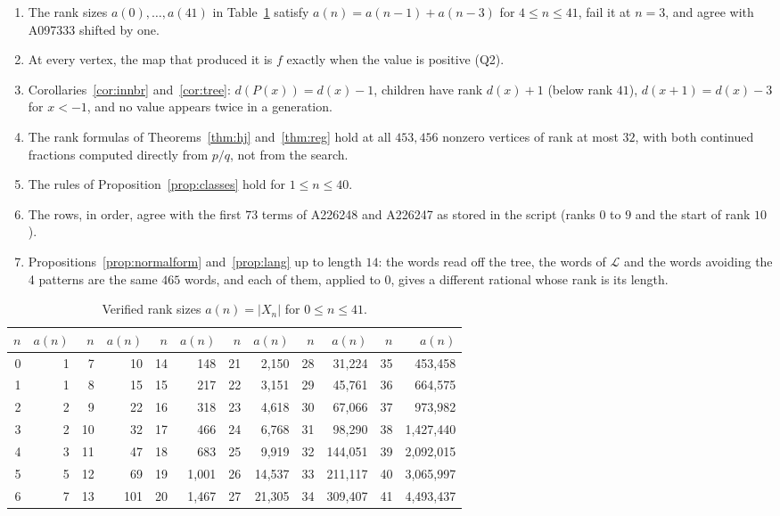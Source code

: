 \documentclass[11pt]{article}
\theoremstyle{definition}
\theoremstyle{remark}
\newcommand{\lang}{\mathcal{L}}
\begin{document}
\begin{enumerate}[itemsep=0pt,topsep=3pt]
\item The rank sizes $a(0),\dots,a(41)$ in Table~\ref{tab:counts} satisfy $a(n)=a(n-1)+a(n-3)$ for
$4\le n\le41$, fail it at $n=3$, and agree with A097333 shifted by one.
\item At every vertex, the map that produced it is $f$ exactly when the value is positive (Q2).
\item Corollaries~\ref{cor:innbr} and~\ref{cor:tree}: $d(P(x))=d(x)-1$, children have rank $d(x)+1$
(below rank $41$), $d(x+1)=d(x)-3$ for $x<-1$, and no value appears twice in a generation.
\item The rank formulas of Theorems~\ref{thm:hj} and~\ref{thm:reg} hold at all $453{,}456$ nonzero
vertices of rank at most $32$, with both continued fractions computed directly from $p/q$, not
from the search.
\item The rules of Proposition~\ref{prop:classes} hold for $1\le n\le40$.
\item The rows, in order, agree with the first $73$ terms of A226248 and A226247 as stored in the
script (ranks $0$ to $9$ and the start of rank $10$).
\item Propositions~\ref{prop:normalform} and~\ref{prop:lang} up to length $14$: the words read off
the tree, the words of $\lang$ and the words avoiding the 4 patterns are the same $465$ words, and
each of them, applied to $0$, gives a different rational whose rank is its length.
\end{enumerate}

\begin{table}[ht]
\centering\small
\begin{tabular}{@{}rr@{\hskip 1.6em}rr@{\hskip 1.6em}rr@{\hskip 1.6em}rr@{\hskip 1.6em}rr@{\hskip 1.6em}rr@{}}
\toprule
$n$ & $a(n)$ & $n$ & $a(n)$ & $n$ & $a(n)$ & $n$ & $a(n)$ & $n$ & $a(n)$ & $n$ & $a(n)$\\
\midrule
0 & 1 & 7 & 10 & 14 & 148 & 21 & 2{,}150 & 28 & 31{,}224 & 35 & 453{,}458\\
1 & 1 & 8 & 15 & 15 & 217 & 22 & 3{,}151 & 29 & 45{,}761 & 36 & 664{,}575\\
2 & 2 & 9 & 22 & 16 & 318 & 23 & 4{,}618 & 30 & 67{,}066 & 37 & 973{,}982\\
3 & 2 & 10 & 32 & 17 & 466 & 24 & 6{,}768 & 31 & 98{,}290 & 38 & 1{,}427{,}440\\
4 & 3 & 11 & 47 & 18 & 683 & 25 & 9{,}919 & 32 & 144{,}051 & 39 & 2{,}092{,}015\\
5 & 5 & 12 & 69 & 19 & 1{,}001 & 26 & 14{,}537 & 33 & 211{,}117 & 40 & 3{,}065{,}997\\
6 & 7 & 13 & 101 & 20 & 1{,}467 & 27 & 21{,}305 & 34 & 309{,}407 & 41 & 4{,}493{,}437\\
\bottomrule
\end{tabular}
\caption{Verified rank sizes $a(n)=|X_n|$ for $0\le n\le41$.}\vspace{-1ex}
\label{tab:counts}
\end{table}
\end{document}
